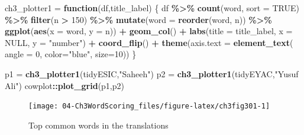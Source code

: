 \documentclass[
]{article}
\newenvironment{Shaded}{\begin{snugshade}}{\end{snugshade}}
\newcommand{\AttributeTok}[1]{\textcolor[rgb]{0.13,0.29,0.53}{#1}}
\newcommand{\ConstantTok}[1]{\textcolor[rgb]{0.56,0.35,0.01}{#1}}
\newcommand{\ControlFlowTok}[1]{\textcolor[rgb]{0.13,0.29,0.53}{\textbf{#1}}}
\newcommand{\DecValTok}[1]{\textcolor[rgb]{0.00,0.00,0.81}{#1}}
\newcommand{\FunctionTok}[1]{\textcolor[rgb]{0.13,0.29,0.53}{\textbf{#1}}}
\newcommand{\NormalTok}[1]{#1}
\newcommand{\OtherTok}[1]{\textcolor[rgb]{0.56,0.35,0.01}{#1}}
\newcommand{\SpecialCharTok}[1]{\textcolor[rgb]{0.81,0.36,0.00}{\textbf{#1}}}
\newcommand{\StringTok}[1]{\textcolor[rgb]{0.31,0.60,0.02}{#1}}
\begin{document}
\begin{Shaded}
\begin{Highlighting}[]
\NormalTok{ch3\_plotter1 }\OtherTok{=} \ControlFlowTok{function}\NormalTok{(df,title\_label) \{}
\NormalTok{      df }\SpecialCharTok{\%\textgreater{}\%} 
      \FunctionTok{count}\NormalTok{(word, }\AttributeTok{sort =} \ConstantTok{TRUE}\NormalTok{) }\SpecialCharTok{\%\textgreater{}\%}
      \FunctionTok{filter}\NormalTok{(n }\SpecialCharTok{\textgreater{}} \DecValTok{150}\NormalTok{) }\SpecialCharTok{\%\textgreater{}\%}
      \FunctionTok{mutate}\NormalTok{(}\AttributeTok{word =} \FunctionTok{reorder}\NormalTok{(word, n)) }\SpecialCharTok{\%\textgreater{}\%}
      \FunctionTok{ggplot}\NormalTok{(}\FunctionTok{aes}\NormalTok{(}\AttributeTok{x =}\NormalTok{ word, }\AttributeTok{y =}\NormalTok{ n)) }\SpecialCharTok{+}
      \FunctionTok{geom\_col}\NormalTok{() }\SpecialCharTok{+}
      \FunctionTok{labs}\NormalTok{(}\AttributeTok{title =}\NormalTok{ title\_label, }\AttributeTok{x =} \ConstantTok{NULL}\NormalTok{, }\AttributeTok{y =} \StringTok{"number"}\NormalTok{) }\SpecialCharTok{+}
      \FunctionTok{coord\_flip}\NormalTok{() }\SpecialCharTok{+}
      \FunctionTok{theme}\NormalTok{(}\AttributeTok{axis.text =} \FunctionTok{element\_text}\NormalTok{( }
            \AttributeTok{angle =} \DecValTok{0}\NormalTok{, }
            \AttributeTok{color=}\StringTok{"blue"}\NormalTok{, }
            \AttributeTok{size=}\DecValTok{10}\NormalTok{))}
\NormalTok{\}}
\end{Highlighting}
\end{Shaded}

\normalsize

\begin{Shaded}
\begin{Highlighting}[]
\NormalTok{p1 }\OtherTok{=} \FunctionTok{ch3\_plotter1}\NormalTok{(tidyESIC,}\StringTok{"Saheeh"}\NormalTok{)}
\NormalTok{p2 }\OtherTok{=} \FunctionTok{ch3\_plotter1}\NormalTok{(tidyEYAC,}\StringTok{"Yusuf Ali"}\NormalTok{)}
\NormalTok{cowplot}\SpecialCharTok{::}\FunctionTok{plot\_grid}\NormalTok{(p1,p2)}
\end{Highlighting}
\end{Shaded}

\begin{figure}

{\centering \texttt{[image: 04-Ch3WordScoring\_files/figure-latex/ch3fig301-1]} 

}

\caption{Top common words in the translations}\label{fig:ch3fig301}
\end{figure}
\end{document}
